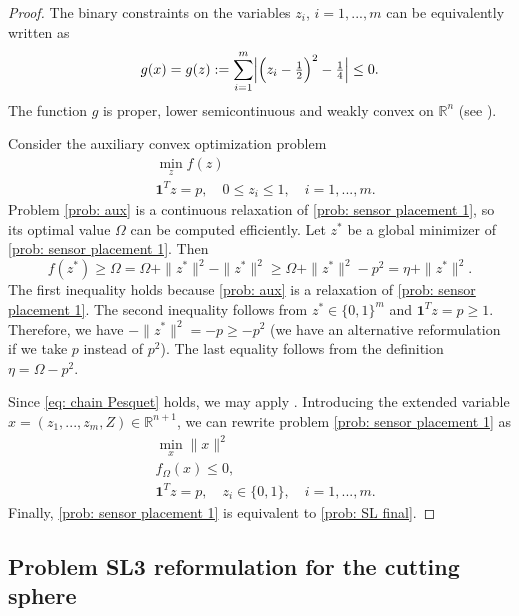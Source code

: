 \documentclass[12pt]{amsart}
\theoremstyle{plain}
\theoremstyle{definition}
\begin{document}
\begin{proof}
The binary constraints on the variables $z_i$, $i=1,...,m$ can be equivalently written as
\[
g(x) = g(z) := \sum_{i=1}^m \Bigl| \Bigl(z_i - \tfrac12\Bigr)^2 - \tfrac14 \Bigr| \le 0.
\]
The function $g$ is proper, lower semicontinuous and weakly convex on $\mathbb{R}^n$ (see \cite{bednarczuk2023forward}).

Consider the auxiliary convex optimization problem
\begin{equation}
\label{prob: aux}
\begin{split}
& \min_z f(z) \\
& \mathbf{1}^T z = p, \quad 0\le z_i\le 1,\quad i=1,...,m.
\end{split}
\end{equation}
Problem \eqref{prob: aux} is a continuous relaxation of \eqref{prob: sensor placement 1}, so its optimal value $\Omega$ can be computed efficiently. Let $z^*$ be a global minimizer of \eqref{prob: sensor placement 1}. Then
\begin{equation}
\label{eq: chain Pesquet}
f(z^*) \ge \Omega = \Omega + \|z^*\|^2 - \|z^*\|^2 \ge \Omega + \|z^*\|^2 - p^2 = \eta + \|z^*\|^2.
\end{equation}
The first inequality holds because \eqref{prob: aux} is a relaxation of \eqref{prob: sensor placement 1}. The second inequality follows from $z^*\in\{0,1\}^m$ and $\mathbf{1}^T z = p\ge 1$.
Therefore, we have $-\|z^*\|^2=-p\ge -p^2$ (we have an alternative reformulation if we take $p$ instead of $p^2$).
The last equality follows from the definition $\eta = \Omega - p^2$.

Since \eqref{eq: chain Pesquet} holds, we may apply \cite[Theorem 1]{bednarczuk2026outer}. Introducing the extended variable $x = (z_1,...,z_m, Z) \in \mathbb{R}^{n+1}$, we can rewrite problem \eqref{prob: sensor placement 1} as
\begin{equation}
\label{prob: aux 2}
\begin{split}
& \min_x \|x\|^2 \\
& f_\Omega(x)\le 0, \\
& \mathbf{1}^T z = p, \quad z_i\in\{0,1\},\quad i=1,...,m.
\end{split}
\end{equation}
Finally, \eqref{prob: sensor placement 1} is equivalent to \eqref{prob: SL final}.
\end{proof}

\subsection{Problem SL3 reformulation for the cutting sphere}
\end{document}
